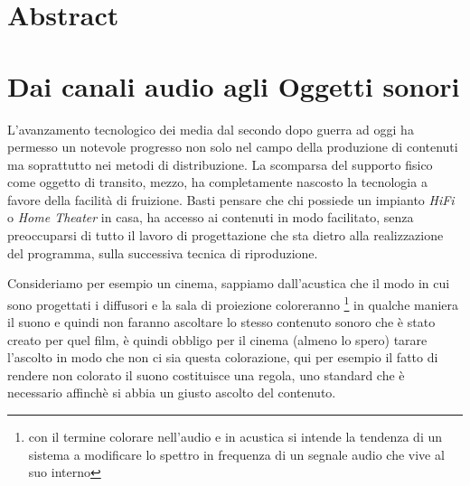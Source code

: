\documentclass[12pt,a4paper]{report}
\begin{document}
\tableofcontents

\listoffigures



\chapter*{Abstract}





\chapter{Dai canali audio agli Oggetti sonori}


L'avanzamento tecnologico dei media dal secondo dopo guerra ad oggi ha permesso un notevole progresso non solo nel campo della produzione di contenuti ma soprattutto nei metodi di distribuzione. La scomparsa del supporto fisico come oggetto di transito, mezzo, ha completamente nascosto la tecnologia a favore della facilità di fruizione. Basti pensare che chi possiede un impianto \emph{HiFi} o \emph{Home Theater} in casa,
ha accesso ai contenuti in modo facilitato, senza preoccuparsi di tutto il lavoro di progettazione che sta dietro alla realizzazione del programma, sulla successiva tecnica di riproduzione.

Consideriamo per esempio un cinema, sappiamo dall'acustica che il modo in cui sono progettati i diffusori e la sala di proiezione coloreranno \footnote{con il termine colorare nell'audio e in acustica si intende la tendenza di un sistema a modificare lo spettro in frequenza di un segnale audio che vive al suo interno} in qualche maniera il suono e quindi non faranno ascoltare lo stesso contenuto sonoro che è stato creato per quel film, è quindi obbligo per il cinema (almeno lo spero) tarare l'ascolto in modo che non ci sia questa colorazione, qui per esempio il fatto   di rendere non colorato il suono costituisce una regola, uno standard che è necessario affinchè si abbia un giusto ascolto del contenuto.\\
\end{document}
